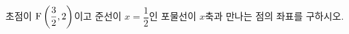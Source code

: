 초점이 $\mathrm{F}\left(\dfrac{3}{2}{,}\mkern3mu\mathopen{}2\right)$이고 준선이 $x=\dfrac{1}{2}$인 포물선이 $x$축과 만나는 점의 좌표를 구하시오.
